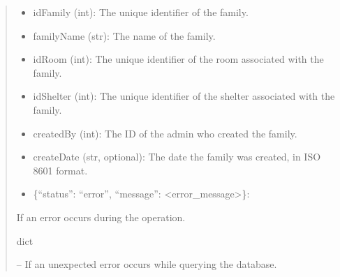 \documentclass[letterpaper,10pt,english]{sphinxmanual}
\begin{document}
\begin{fulllineitems}
\begin{fulllineitems}
\begin{quote}
\begin{description}
\begin{description}
\begin{itemize}
\end{itemize}
\begin{description}
\begin{itemize}
\item {} 
\sphinxAtStartPar
idFamily (int): The unique identifier of the family.

\item {} 
\sphinxAtStartPar
familyName (str): The name of the family.

\item {} 
\sphinxAtStartPar
idRoom (int): The unique identifier of the room associated with the family.

\item {} 
\sphinxAtStartPar
idShelter (int): The unique identifier of the shelter associated with the family.

\item {} 
\sphinxAtStartPar
createdBy (int): The ID of the admin who created the family.

\item {} 
\sphinxAtStartPar
createDate (str, optional): The date the family was created, in ISO 8601 format.

\end{itemize}

\end{description}
\begin{itemize}
\item {} 
\sphinxAtStartPar
\{“status”: “error”, “message”: <error\_message>\}:

\end{itemize}

\sphinxAtStartPar
If an error occurs during the operation.

\end{description}


\sphinxAtStartPar
dict

\sphinxAtStartPar
{} – If an unexpected error occurs while querying the database.

\end{description}\end{quote}

\end{fulllineitems}


\end{fulllineitems}
\end{document}
